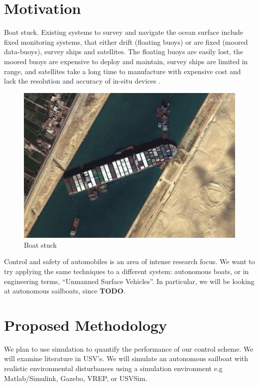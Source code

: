 \documentclass[conference]{IEEEtran}
\begin{document}
\section{Motivation}
Boat stuck. Existing systems to survey and navigate the ocean surface include fixed monitoring systems, that either drift (floating buoys) or are fixed (moored data-buoys), survey ships and satellites. The floating buoys are easily lost, the moored buoys are expensive to deploy and maintain, survey ships are limited in range, and satellites take a long time to manufacture with expensive cost and lack the resolution and accuracy of in-situ devices \cite{Sauzé2006}.
\begin{figure}
    \centering
    \includegraphics{documents/proposal/Suez_Canal_blocked_by_Ever_Given_March_27_2021.jpg}
    \caption{Boat stuck\label{fig:boat_stuck}}
\end{figure}
Control and safety of automobiles is an area of intense research focus. We want to try applying the same techniques to a different system: autonomous boats, or in engineering terms, \enquote{Unmanned Surface Vehicles}. In particular, we will be looking at autonomous sailboats, since \textbf{TODO}.

\section{Proposed Methodology}
We plan to use simulation to quantify the performance of our control scheme. We will examine literature in USV's.
We will simulate an autonomous sailboat with realistic environmental disturbances using a simulation environment e.g Matlab/Simulink, Gazebo, VREP, or USVSim.   
\end{document}
